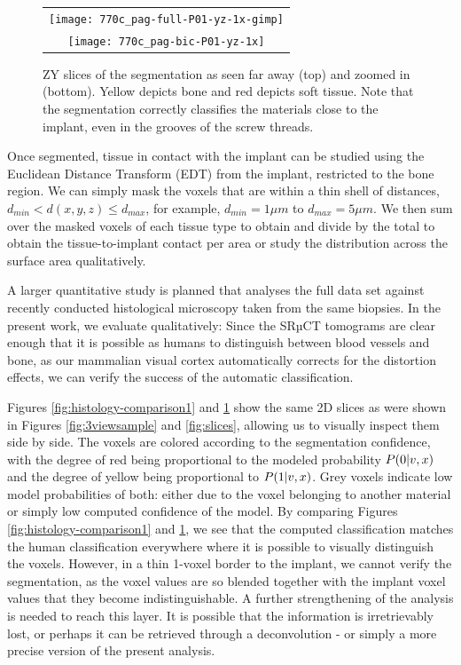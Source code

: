 \begin{figure}
  \centering
  \begin{tabular}{c}
    \hspace{-0.5cm}\texttt{[image: 770c\_pag-full-P01-yz-1x-gimp]} \\
    \texttt{[image: 770c\_pag-bic-P01-yz-1x]}
  \end{tabular}
  \caption{
    ZY slices of the segmentation as seen far away (top) and zoomed in (bottom).
    Yellow depicts bone and red depicts soft tissue. Note that the segmentation
    correctly classifies the materials close to the implant, even in the
    grooves of the screw threads.
  }
  \label{fig:histology-comparison2}
\end{figure}

Once segmented, tissue in contact with the implant can be studied using the
Euclidean Distance Transform (EDT) from the implant, restricted to the bone
region. We can simply mask the voxels that are within a thin shell of
distances, $d_{min} < d(x,y,z) \le d_{max}$, for example, $d_{min} = 1\mu m$ to
$d_{max} = 5\mu m$. We then sum over the masked voxels of each tissue type to
obtain and divide by the total to obtain the tissue-to-implant contact per area
or study the distribution across the surface area qualitatively.

A larger quantitative study is planned that analyses the full data set against
recently conducted histological microscopy taken from the same biopsies. In the
present work, we evaluate qualitatively: Since the SRµCT tomograms are clear
enough that it is possible as humans to distinguish between blood vessels and
bone, as our mammalian visual cortex automatically corrects for the distortion
effects, we can verify the success of the automatic classification.

Figures \ref{fig:histology-comparison1} and \ref{fig:histology-comparison2}
show the same 2D slices as were shown in Figures \ref{fig:3viewsample} and
\ref{fig:slices}, allowing us to visually inspect them side by side. The voxels
are colored according to the segmentation confidence, with the degree of red
being proportional to the modeled probability $P\!\left(0\middle\vert v,x\right)$ and the degree
of yellow being proportional to $P\!\left(1\middle\vert v,x\right)$. Grey voxels indicate low
model probabilities of both: either due to the voxel belonging to another
material or simply low computed confidence of the model. By comparing Figures
\ref{fig:histology-comparison1} and \ref{fig:histology-comparison2}, we see
that the computed classification matches the human classification everywhere
where it is possible to visually distinguish the voxels. However, in a thin
1-voxel border to the implant, we cannot verify the segmentation, as the voxel
values are so blended together with the implant voxel values that they become
indistinguishable. A further strengthening of the analysis is needed to reach
this layer. It is possible that the information is irretrievably lost, or
perhaps it can be retrieved through a deconvolution - or simply a more precise
version of the present analysis.

